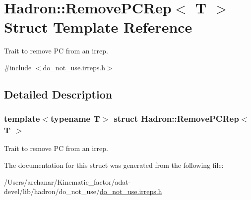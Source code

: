 \hypertarget{structHadron_1_1RemovePCRep}{}\section{Hadron\+:\+:Remove\+P\+C\+Rep$<$ T $>$ Struct Template Reference}
\label{structHadron_1_1RemovePCRep}


Trait to remove PC from an irrep.  




{\ttfamily \#include $<$do\+\_\+not\+\_\+use.\+irreps.\+h$>$}



\subsection{Detailed Description}
\subsubsection*{template$<$typename T$>$\newline
struct Hadron\+::\+Remove\+P\+C\+Rep$<$ T $>$}

Trait to remove PC from an irrep. 

The documentation for this struct was generated from the following file\+:\begin{DoxyCompactItemize}
\item 
/\+Users/archanar/\+Kinematic\+\_\+factor/adat-\/devel/lib/hadron/do\+\_\+not\+\_\+use/\mbox{\hyperlink{adat-devel_2lib_2hadron_2do__not__use_2do__not__use_8irreps_8h}{do\+\_\+not\+\_\+use.\+irreps.\+h}}\end{DoxyCompactItemize}
